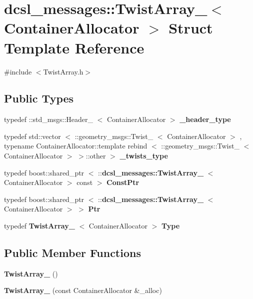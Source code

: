 \section{dcsl\-\_\-messages\-:\-:\-Twist\-Array\-\_\-$<$ \-Container\-Allocator $>$ \-Struct \-Template \-Reference}
\label{structdcsl__messages_1_1TwistArray__}


{\ttfamily \#include $<$\-Twist\-Array.\-h$>$}

\subsection*{\-Public \-Types}
\begin{DoxyCompactItemize}
\item 
typedef \-::std\-\_\-msgs\-::\-Header\-\_\-\*
$<$ \-Container\-Allocator $>$ {\bf \-\_\-header\-\_\-type}
\item 
typedef std\-::vector\*
$<$ \-::geometry\-\_\-msgs\-::\-Twist\-\_\-\*
$<$ \-Container\-Allocator $>$\*
, typename \*
\-Container\-Allocator\-::template \*
rebind\*
$<$ \-::geometry\-\_\-msgs\-::\-Twist\-\_\-\*
$<$ \-Container\-Allocator $>$\*
 $>$\-::other $>$ {\bf \-\_\-twists\-\_\-type}
\item 
typedef boost\-::shared\-\_\-ptr\*
$<$ \-::{\bf dcsl\-\_\-messages\-::\-Twist\-Array\-\_\-}\*
$<$ \-Container\-Allocator $>$ const  $>$ {\bf \-Const\-Ptr}
\item 
typedef boost\-::shared\-\_\-ptr\*
$<$ \-::{\bf dcsl\-\_\-messages\-::\-Twist\-Array\-\_\-}\*
$<$ \-Container\-Allocator $>$ $>$ {\bf \-Ptr}
\item 
typedef {\bf \-Twist\-Array\-\_\-}\*
$<$ \-Container\-Allocator $>$ {\bf \-Type}
\end{DoxyCompactItemize}
\subsection*{\-Public \-Member \-Functions}
\begin{DoxyCompactItemize}
\item 
{\bf \-Twist\-Array\-\_\-} ()
\item 
{\bf \-Twist\-Array\-\_\-} (const \-Container\-Allocator \&\-\_\-alloc)
\end{DoxyCompactItemize}
